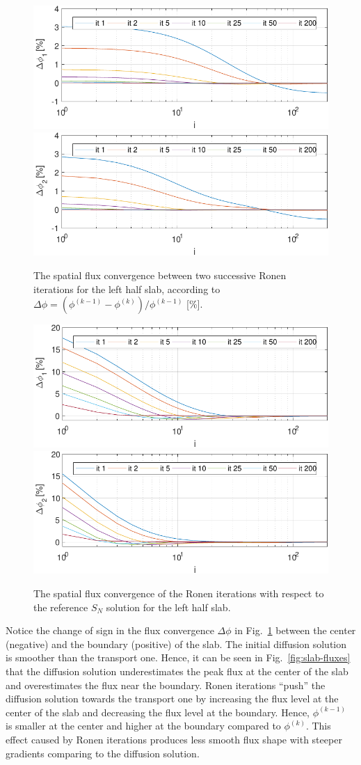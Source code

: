 \begin{figure}[htbp]
	\centering
	\includegraphics[width=0.48\linewidth]{flux_deviation_half_it_1.pdf}
	\includegraphics[width=0.48\linewidth]{flux_deviation_half_it_2.pdf}
	\caption{The spatial flux convergence between two successive Ronen iterations for the left half slab, according to $\Delta\phi = (\phi^{(k-1)}-\phi^{(k)})/\phi^{(k-1)}$ [\%].}
	\label{fig:conv2}
\end{figure}

\begin{figure}[hbtp]
	\centering
	\includegraphics[width=0.48\linewidth]{flux_deviation_half_it_1_sn.pdf}
	\includegraphics[width=0.48\linewidth]{flux_deviation_half_it_2_sn.pdf}
	\caption{The spatial flux convergence of the Ronen iterations with respect to the reference $S_N$ solution for the left half slab.}
	\label{fig:conv3}
\end{figure}

Notice the change of sign in the flux convergence $\Delta \phi$ in Fig.~\ref{fig:conv2} between the center (negative) and the boundary (positive) of the slab. The initial diffusion solution is smoother than the transport one. Hence, it can be seen in Fig.~\ref{fig:slab-fluxes} that the diffusion solution underestimates the peak flux at the center of the slab and overestimates the flux near the boundary. Ronen iterations ``push'' the diffusion solution towards the transport one by increasing the flux level at the center of the slab and decreasing the flux level at the boundary. Hence, $\phi^{(k-1)}$ is smaller at the center and higher at the boundary compared to $\phi^{(k)}$. This effect caused by Ronen iterations produces less smooth flux shape with steeper gradients comparing to the diffusion solution.
%
